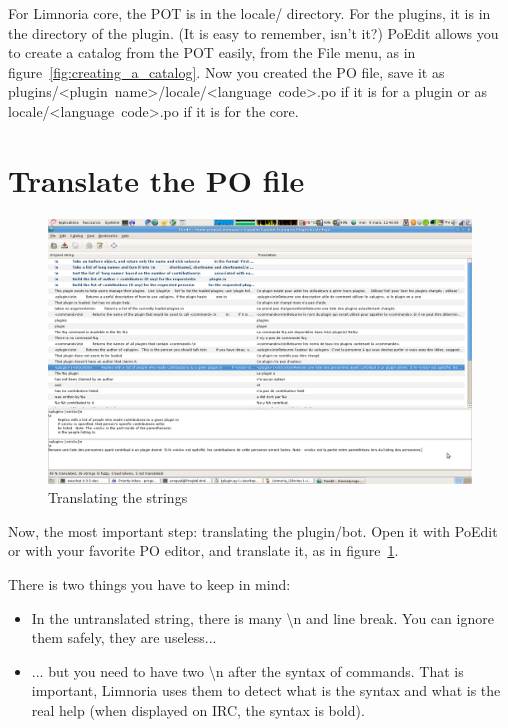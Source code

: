 \documentclass[a4paper,11pt]{article}
\begin{document}
    For Limnoria core, the POT is in the locale/ directory. For the plugins,
    it is in the directory of the plugin. (It is easy to remember, isn't it?)
    PoEdit allows you to create a catalog from the POT easily, from the File
    menu, as in figure~\ref{fig:creating_a_catalog}.
    Now you created the PO file, save it as
    \mbox{plugins/<plugin name>/locale/<language code>.po} if it is for a
    plugin or as \mbox{locale/<language code>.po} if it is for the core.
  
  \section{Translate the PO file}
    \begin{figure}
      \begin{center}
        \includegraphics[scale=0.25]{pictures/translate_the_strings.png}
        \caption{Translating the strings}
        \label{fig:translating_the_strings}
      \end{center}
    \end{figure}
    Now, the most important step: translating the plugin/bot. Open it with
    PoEdit or with your favorite PO editor, and translate it, as in
    figure~\ref{fig:translating_the_strings}.
    
    There is two things you have to keep in mind:
    \begin{itemize}
      \item In the untranslated string, there is many \textbackslash{}n and 
        line break. You can ignore them safely, they are useless...
      \item ... but you need to have two \textbackslash{}n after the syntax
        of commands. That is important, Limnoria uses them to detect what is
        the syntax and what is the real help (when displayed on IRC, the
        syntax is bold).
    \end{itemize}
    
\end{document}
